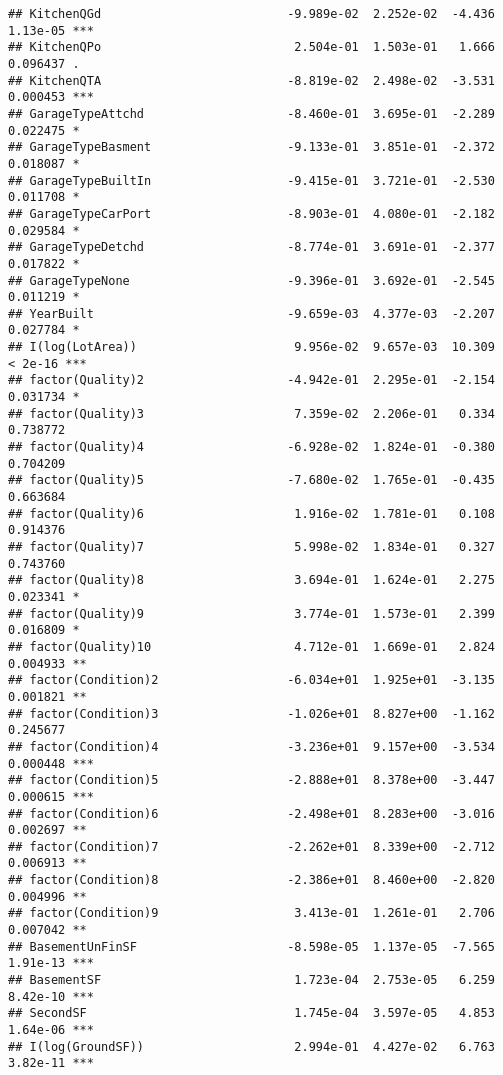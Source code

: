 \documentclass[
]{article}
\begin{document}
\begin{verbatim}
## KitchenQGd                          -9.989e-02  2.252e-02  -4.436 1.13e-05 ***
## KitchenQPo                           2.504e-01  1.503e-01   1.666 0.096437 .  
## KitchenQTA                          -8.819e-02  2.498e-02  -3.531 0.000453 ***
## GarageTypeAttchd                    -8.460e-01  3.695e-01  -2.289 0.022475 *  
## GarageTypeBasment                   -9.133e-01  3.851e-01  -2.372 0.018087 *  
## GarageTypeBuiltIn                   -9.415e-01  3.721e-01  -2.530 0.011708 *  
## GarageTypeCarPort                   -8.903e-01  4.080e-01  -2.182 0.029584 *  
## GarageTypeDetchd                    -8.774e-01  3.691e-01  -2.377 0.017822 *  
## GarageTypeNone                      -9.396e-01  3.692e-01  -2.545 0.011219 *  
## YearBuilt                           -9.659e-03  4.377e-03  -2.207 0.027784 *  
## I(log(LotArea))                      9.956e-02  9.657e-03  10.309  < 2e-16 ***
## factor(Quality)2                    -4.942e-01  2.295e-01  -2.154 0.031734 *  
## factor(Quality)3                     7.359e-02  2.206e-01   0.334 0.738772    
## factor(Quality)4                    -6.928e-02  1.824e-01  -0.380 0.704209    
## factor(Quality)5                    -7.680e-02  1.765e-01  -0.435 0.663684    
## factor(Quality)6                     1.916e-02  1.781e-01   0.108 0.914376    
## factor(Quality)7                     5.998e-02  1.834e-01   0.327 0.743760    
## factor(Quality)8                     3.694e-01  1.624e-01   2.275 0.023341 *  
## factor(Quality)9                     3.774e-01  1.573e-01   2.399 0.016809 *  
## factor(Quality)10                    4.712e-01  1.669e-01   2.824 0.004933 ** 
## factor(Condition)2                  -6.034e+01  1.925e+01  -3.135 0.001821 ** 
## factor(Condition)3                  -1.026e+01  8.827e+00  -1.162 0.245677    
## factor(Condition)4                  -3.236e+01  9.157e+00  -3.534 0.000448 ***
## factor(Condition)5                  -2.888e+01  8.378e+00  -3.447 0.000615 ***
## factor(Condition)6                  -2.498e+01  8.283e+00  -3.016 0.002697 ** 
## factor(Condition)7                  -2.262e+01  8.339e+00  -2.712 0.006913 ** 
## factor(Condition)8                  -2.386e+01  8.460e+00  -2.820 0.004996 ** 
## factor(Condition)9                   3.413e-01  1.261e-01   2.706 0.007042 ** 
## BasementUnFinSF                     -8.598e-05  1.137e-05  -7.565 1.91e-13 ***
## BasementSF                           1.723e-04  2.753e-05   6.259 8.42e-10 ***
## SecondSF                             1.745e-04  3.597e-05   4.853 1.64e-06 ***
## I(log(GroundSF))                     2.994e-01  4.427e-02   6.763 3.82e-11 ***

\end{verbatim}
\end{document}
